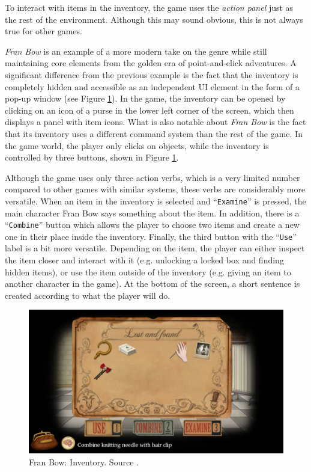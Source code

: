 To interact with items in the inventory, the game uses the \textit{action panel} just as the rest of the environment. Although this may sound obvious, this is not always true for other games. 

\textit{Fran Bow} is an example of a more modern take on the genre while still maintaining core elements from the golden era of point-and-click adventures.  A significant difference from the previous example is the fact that the inventory is completely hidden and accessible as an independent UI element in the form of a pop-up window (see Figure \ref{fig:I-FranBow}). In the game, the inventory can be opened by clicking on an icon of a purse in the lower left corner of the screen, which then displays a panel with item icons. What is also notable about \textit{Fran Bow} is the fact that its inventory uses a different command system than the rest of the game. In the game world, the player only clicks on objects, while the inventory is controlled by three buttons, shown in Figure \ref{fig:I-FranBow}. 

Although the game uses only three action verbs, which is a very limited number compared to other games with similar systems, these verbs are considerably more versatile. When an item in the inventory is selected and “\texttt{Examine}” is pressed, the main character Fran Bow says something about the item. In addition, there is a “\texttt{Combine}” button which allows the player to choose two items and create a new one in their place inside the inventory. Finally, the third button with the “\texttt{Use}” label is a bit more versatile. Depending on the item, the player can either inspect the item closer and interact with it (e.g. unlocking a locked box and finding hidden items), or use the item outside of the inventory (e.g. giving an item to another character in the game). At the bottom of the screen, a short sentence is created according to what the player will do.

\begin{figure}[H]
\centering
\includegraphics[width=.75\linewidth]{img/Fran_Bow.png}
\caption{Fran Bow: Inventory. Source \cite{FranBow}.}
\label{fig:I-FranBow}
\end{figure}

